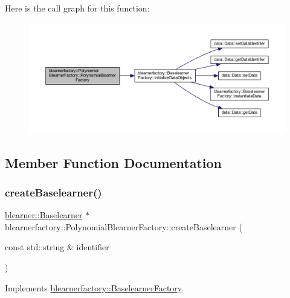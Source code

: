 Here is the call graph for this function\+:\nopagebreak
\begin{figure}[H]
\begin{center}
\leavevmode
\includegraphics[width=350pt]{classblearnerfactory_1_1_polynomial_blearner_factory_a87a3247a9abe49009e1e951f25ed97cf_cgraph}
\end{center}
\end{figure}


\subsection{Member Function Documentation}
\mbox{\label{classblearnerfactory_1_1_polynomial_blearner_factory_ac0c7f742da0a2de444e91a0cfb0a9384}} 
\subsubsection{\texorpdfstring{create\+Baselearner()}{createBaselearner()}}
{\footnotesize\ttfamily \mbox{\hyperlink{classblearner_1_1_baselearner}{blearner\+::\+Baselearner}} $\ast$ blearnerfactory\+::\+Polynomial\+Blearner\+Factory\+::create\+Baselearner (\begin{DoxyParamCaption}\item[{const std\+::string \&}]{identifier }\end{DoxyParamCaption})\hspace{0.3cm}{\ttfamily [virtual]}}



Implements \mbox{\hyperlink{classblearnerfactory_1_1_baselearner_factory_ac3584a20a84834099a15908690b837bb}{blearnerfactory\+::\+Baselearner\+Factory}}.

